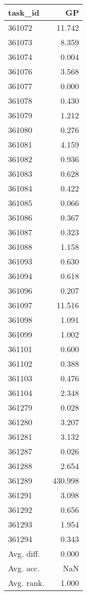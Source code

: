 \begin{tabular}{lr}
\toprule
task\_id & GP \\
\midrule
361072 & 11.742 \\
361073 & 8.359 \\
361074 & 0.004 \\
361076 & 3.568 \\
361077 & 0.000 \\
361078 & 0.430 \\
361079 & 1.212 \\
361080 & 0.276 \\
361081 & 4.159 \\
361082 & 0.936 \\
361083 & 0.628 \\
361084 & 0.422 \\
361085 & 0.066 \\
361086 & 0.367 \\
361087 & 0.323 \\
361088 & 1.158 \\
361093 & 0.630 \\
361094 & 0.618 \\
361096 & 0.207 \\
361097 & 11.516 \\
361098 & 1.091 \\
361099 & 1.002 \\
361101 & 0.600 \\
361102 & 0.388 \\
361103 & 0.476 \\
361104 & 2.348 \\
361279 & 0.028 \\
361280 & 3.207 \\
361281 & 3.132 \\
361287 & 0.026 \\
361288 & 2.654 \\
361289 & 430.998 \\
361291 & 3.098 \\
361292 & 0.656 \\
361293 & 1.954 \\
361294 & 0.343 \\
Avg. diff. & 0.000 \\
Avg. acc. & NaN \\
Avg. rank. & 1.000 \\
\bottomrule
\end{tabular}
